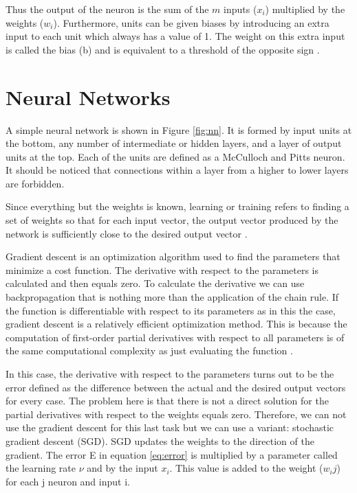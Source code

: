 Thus the output of the neuron is the sum of the $m$ inputs ($x_i$) multiplied by the weights ($w_i$). Furthermore, units can be given biases by introducing an extra input to each unit which always has a value of 1. The weight on this extra input is called the bias (b) and is equivalent to a threshold of the opposite sign \cite{polk2002cognitive}. 


\section{Neural Networks}

A simple neural network is shown in Figure \ref{fig:nn}. It is formed by input units at the bottom, any number of intermediate or hidden layers, and a layer of output units at the top. Each of the units are  defined as a McCulloch and Pitts neuron. It should be noticed that connections within a layer from a higher to lower layers are forbidden. 

Since everything but the weights is known, learning or training refers to finding a set of weights so that for each input vector, the output vector produced by the network is sufficiently close to the desired output vector \cite{polk2002cognitive}. 

Gradient descent is an optimization algorithm used to find the parameters  that minimize a cost function. The derivative with respect to the parameters is calculated and then equals zero. To calculate the derivative we can use backpropagation that is nothing more than the application of the chain rule.
If the function is differentiable with respect to its parameters as in this the case, gradient descent is a relatively efficient optimization method. This is because the computation of first-order partial derivatives with respect to all parameters is of the same computational complexity as just evaluating the function \cite{kingma2014adam}. 

In this case, the derivative with respect to the parameters turns out to be the error defined as the difference between the actual and the desired output vectors for every case. The problem here is that there is not a direct solution for the partial derivatives with respect to the weights equals zero. Therefore, we can not use the gradient descent for this last task but we can use a variant: stochastic gradient descent (SGD).
SGD updates the weights to the direction of the gradient. The error E in equation \ref{eq:error} is multiplied by a parameter called the learning rate $\nu$ and by the input $x_i$. This value is added to the weight ($w_ij$) for each j neuron and input i.

